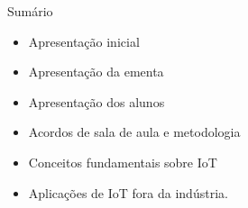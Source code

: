 
\begin{frame}{Sumário}
    \begin{itemize}
        \item Apresentação inicial
        \item Apresentação da ementa
        \item Apresentação dos alunos
        \item Acordos de sala de aula e metodologia
        \item Conceitos fundamentais sobre IoT
        \item Aplicações de IoT fora da indústria.
    \end{itemize}
\end{frame}
